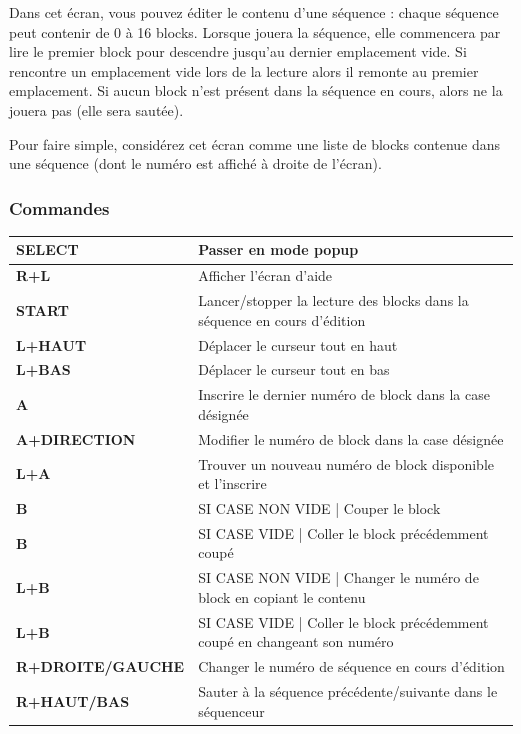 \documentclass[12pt,a4paper]{article}
\begin{document}
    Dans cet écran, vous pouvez éditer le contenu d'une séquence : chaque séquence peut contenir de 0 à 16 blocks.
    Lorsque \FAT jouera la séquence, elle commencera par lire le premier block pour descendre jusqu'au dernier emplacement vide.
    Si \FAT rencontre un emplacement vide lors de la lecture alors il remonte au premier emplacement.
    Si aucun block n'est présent dans la séquence en cours, alors \FAT ne la jouera pas (elle sera sautée).
    \medskip
    
    Pour faire simple, considérez cet écran comme une liste de blocks contenue dans une séquence (dont le numéro est affiché à droite de l'écran).
    
    
    \subsubsection{Commandes}
    \tablelasttail{\hline}
    \begin{supertabular}{|l|p{11cm}|}
    \hline
        {\bf SELECT} & Passer en mode popup \\
        \hline
        {\bf R+L} & Afficher l'écran d'aide \\
        \hline
        {\bf START} & Lancer/stopper la lecture des blocks dans la séquence en cours d'édition \\
        \hline
        {\bf L+HAUT} & Déplacer le curseur tout en haut \\
        \hline
        {\bf L+BAS} & Déplacer le curseur tout en bas \\
        \hline
        {\bf A} & Inscrire le dernier numéro de block dans la case désignée \\
        \hline
        {\bf A+DIRECTION} & Modifier le numéro de block dans la case désignée \\
        \hline
        {\bf L+A} & Trouver un nouveau numéro de block disponible et l'inscrire \\
        \hline
        {\bf B} & SI CASE NON VIDE | Couper le block \\
        \hline
        {\bf B} & SI CASE VIDE | Coller le block précédemment coupé \\
        \hline
        {\bf L+B} & SI CASE NON VIDE | Changer le numéro de block en copiant le contenu \\
        \hline
        {\bf L+B} & SI CASE VIDE | Coller le block précédemment coupé en changeant son numéro \\
        \hline
        {\bf R+DROITE/GAUCHE} & Changer le numéro de séquence en cours d'édition \\
        \hline
        {\bf R+HAUT/BAS} & Sauter à la séquence précédente/suivante dans le séquenceur \\
    \hline
    \end{supertabular}
\end{document}

